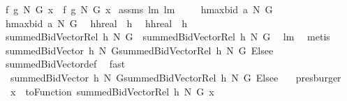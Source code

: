 \begin{isabellebody}
{\isacharparenleft}\ {\isachardoublequoteopen}{\isacharquery}f{}\ {\isacharquery}g{}\ N\ G\ x\ {\isacharequal}\ {\isacharquery}f{}\ {\isacharquery}g{}\ N\ G\ x{\isachardoublequoteclose}{\isacharparenright}\isanewline
%
\isadelimproof
%
\endisadelimproof
%
\isatagproof
{}\isamarkupfalse%
\ assms\ lm{}{}\ lm{}{}\ \ \isanewline
{}\isamarkupfalse%
\ {\isacharminus}\isanewline
{}\isamarkupfalse%
\ {\isacharquery}h{}{\isacharequal}{\isachardoublequoteopen}maxbid{\isacharprime}\ a\ N\ G{\isachardoublequoteclose}\ \isamarkupfalse%
\ {\isacharquery}h{}{\isacharequal}{\isachardoublequoteopen}maxbid\ a\ N\ G{\isachardoublequoteclose}\ \isamarkupfalse%
\ {\isacharquery}hh{}{\isacharequal}{\isachardoublequoteopen}real\ {\isasymcirc}\ {\isacharquery}h{}{\isachardoublequoteclose}\ \isamarkupfalse%
\ {\isacharquery}hh{}{\isacharequal}{\isachardoublequoteopen}real\ {\isasymcirc}\ {\isacharquery}h{}{\isachardoublequoteclose}\isanewline
{}\isamarkupfalse%
\ {\isachardoublequoteopen}summedBidVectorRel\ {\isacharquery}h{}\ N\ G\ {\isacharequal}\ summedBidVectorRel\ {\isacharquery}h{}\ N\ G{\isachardoublequoteclose}\ \isamarkupfalse%
\ lm{}{}\ \isamarkupfalse%
\ metis\ \isanewline
{}\isamarkupfalse%
\ \isamarkupfalse%
\ {\isachardoublequoteopen}summedBidVector\ {\isacharquery}h{}\ N\ G{\isacharequal}{\isacharparenleft}summedBidVectorRel\ {\isacharquery}h{}\ N\ G{\isacharparenright}\ Elsee\ {}{\isachardoublequoteclose}\isanewline
{}\isamarkupfalse%
\ summedBidVector{\isacharunderscore}def\ \isamarkupfalse%
\ fast\isanewline
{}\isamarkupfalse%
\ \isamarkupfalse%
\ {\isachardoublequoteopen}\ summedBidVector\ {\isacharquery}h{}\ N\ G{\isacharequal}summedBidVectorRel\ {\isacharquery}h{}\ N\ G\ Elsee\ {}{\isachardoublequoteclose}\ \isamarkupfalse%
\ presburger\isanewline
{}\isamarkupfalse%
\ \isamarkupfalse%
\ {\isachardoublequoteopen}{\isachardot}{\isachardot}{\isachardot}\ x\ {\isacharequal}\ {\isacharparenleft}toFunction\ {\isacharparenleft}summedBidVectorRel\ {\isacharquery}h{}\ N\ G{\isacharparenright}{\isacharparenright}\ x{\isachardoublequoteclose}\ \isamarkupfalse%

\end{isabellebody}
